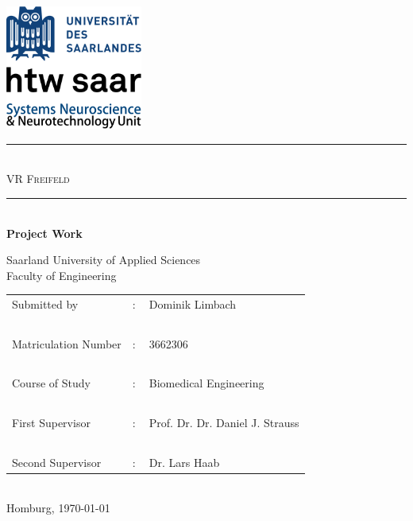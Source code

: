 \documentclass[
    12pt,
    a4paper,
	chapterprefix=false,
	parskip=full,
	headings=normal,
	numbers=noenddot
]{scrreprt}
\begin{document}
\begin{flushright}
	\includegraphics[width=4.5cm]{images/logo}
\end{flushright}

\begin{center}
	\vspace{\fill}
	\rule{\textwidth}{1pt}
	~\\
	\Large
	\textsc{VR Freifeld}\\
    \rule{\textwidth}{1pt}\\
    \vspace{\fill}
    \Large
	\textbf{Project Work}\\
	\vspace{\fill}
	\normalsize
	
	Saarland University of Applied Sciences\\
	Faculty of Engineering\\
    \vspace{\fill}
	\begin{tabular}{l l l}
		Submitted by & : & Dominik Limbach\\
		~ & ~ & ~\\
		Matriculation Number & : & 3662306\\
		~ & ~ & ~\\
		Course of Study & : & Biomedical Engineering\\
		~ & ~ & ~\\
		First Supervisor & : & Prof. Dr. Dr. Daniel J. Strauss\\
		~ & ~ & ~\\
		Second Supervisor & : & Dr. Lars Haab\\
	\end{tabular}
	~\\
	\vspace{\fill}
	Homburg, \today
\end{center}

\thispagestyle{empty}
\end{document}
